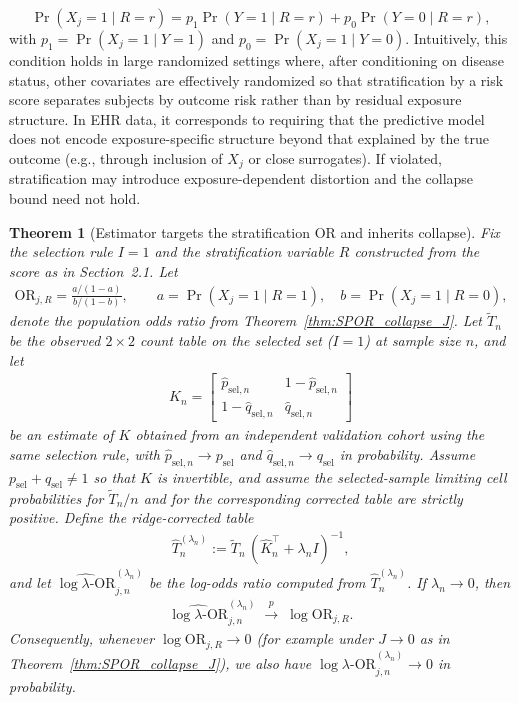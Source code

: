 \documentclass[pdflatex,sn-mathphys-num]{sn-jnl}%
\def\EQSP{3pt}
\newcommand{\cgather}[2][\EQSP]{\begingroup\setlength\abovedisplayskip{#1}\setlength\belowdisplayskip{#1}\begin{gather} #2 \end{gather}\endgroup\noindent}
\theoremstyle{thmstyleone}%
\newtheorem{theorem}{Theorem}%
\theoremstyle{thmstyletwo}%
\theoremstyle{thmstylethree}%
\begin{document}
\[
\Pr(X_j=1 \mid R=r)
=
p_1 \Pr(Y=1 \mid R=r)
+
p_0 \Pr(Y=0 \mid R=r),
\]
with $p_1=\Pr(X_j=1\mid Y=1)$ and $p_0=\Pr(X_j=1\mid Y=0)$. Intuitively, this condition holds in large randomized settings where, after conditioning on disease status, other covariates are effectively randomized so that stratification by a risk score separates subjects by outcome risk rather than by residual exposure structure. In EHR data, it corresponds to requiring that the predictive model does not encode exposure-specific structure beyond that explained by the true outcome (e.g., through inclusion of $X_j$ or close surrogates). If violated, stratification may introduce exposure-dependent distortion and the collapse bound need not hold.
%
\begin{theorem}[Estimator targets the stratification OR and inherits collapse]\label{thm:inherit_collapse}
Fix the selection rule $I=1$ and the stratification variable $R$ constructed from the score as in Section~2.1.
Let
\cgather{
\mathrm{OR}_{j,R}
=
\frac{a/(1-a)}{b/(1-b)},
\qquad
a=\Pr(X_j=1\mid R=1),\quad b=\Pr(X_j=1\mid R=0),
}
denote the population odds ratio from Theorem~\ref{thm:SPOR_collapse_J}.
%
Let $\tilde T_n$ be the observed $2\times2$ count table on the selected set ($I=1$) at sample size $n$, and let
\cgather{
\hat K_n=
\begin{bmatrix}
\hat p_{\mathrm{sel},n} & 1-\hat p_{\mathrm{sel},n}\\
1-\hat q_{\mathrm{sel},n} & \hat q_{\mathrm{sel},n}
\end{bmatrix}
}
be an estimate of $K$ obtained from an independent validation cohort using the same selection rule, with
$\hat p_{\mathrm{sel},n}\to p_{\mathrm{sel}}$ and $\hat q_{\mathrm{sel},n}\to q_{\mathrm{sel}}$ in probability.
Assume $p_{\mathrm{sel}}+q_{\mathrm{sel}}\neq 1$ so that $K$ is invertible, and assume the selected-sample limiting cell probabilities for
$\tilde T_n/n$ and for the corresponding corrected table are strictly positive.
%
Define the ridge-corrected table
\cgather{
\hat T^{(\lambda_n)}_n := \tilde T_n\,(\hat K_n^\top+\lambda_n I)^{-1},
}
and let $\widehat{\log\lambda\text{-OR}}_{j,n}^{(\lambda_n)}$ be the log-odds ratio computed from $\hat T^{(\lambda_n)}_n$. If $\lambda_n\to 0$, then
\cgather{
\widehat{\log\lambda\text{-OR}}_{j,n}^{(\lambda_n)} \;\xrightarrow{p}\; \log \mathrm{OR}_{j,R}.
}
Consequently, whenever $\log \mathrm{OR}_{j,R}\to 0$ (for example under $J\to 0$ as in Theorem~\ref{thm:SPOR_collapse_J}),
we also have $\widehat{\log\lambda\text{-OR}}_{j,n}^{(\lambda_n)}\to 0$ in probability.
\end{theorem}
\end{document}
